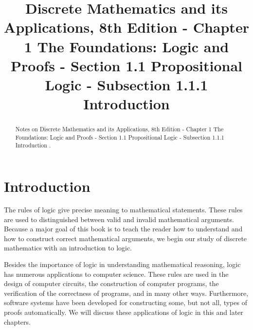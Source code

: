 \documentclass{Axon}
\title{Discrete Mathematics and its Applications, 8th Edition - Chapter 1 The Foundations: Logic and Proofs - Section 1.1 Propositional Logic - Subsection 1.1.1 Introduction}
\begin{document}
\maketitle
\makeauthor
\begin{abstract}
Notes on Discrete Mathematics and its Applications, 8th Edition - Chapter 1 The Foundations: Logic and Proofs - Section 1.1 Propositional Logic - Subsection 1.1.1 Introduction \cite{Rosen}.
\end{abstract}
\section{Introduction}
The rules of logic give precise meaning to mathematical statements. These rules are used to distinguished between valid and invalid mathematical arguments. Because a major goal of this book is to teach the reader how to understand and how to construct correct mathematical arguments, we begin our study of discrete mathematics with an introduction to logic.

Besides the importance of logic in understanding mathematical reasoning, logic has numerous applications to computer science. These rules are used in the design of computer circuits, the construction of computer programs, the verification of the correctness of programs, and in many other ways. Furthermore, software systems have been developed for constructing some, but not all, types of proofs automatically. We will discuss these applications of logic in this and later chapters.

\printbibliography
\end{document}
